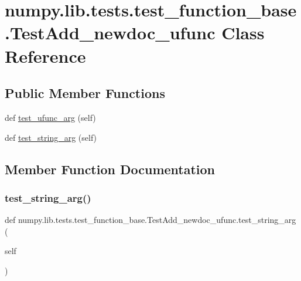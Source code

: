 \hypertarget{classnumpy_1_1lib_1_1tests_1_1test__function__base_1_1TestAdd__newdoc__ufunc}{}\section{numpy.\+lib.\+tests.\+test\+\_\+function\+\_\+base.\+Test\+Add\+\_\+newdoc\+\_\+ufunc Class Reference}
\label{classnumpy_1_1lib_1_1tests_1_1test__function__base_1_1TestAdd__newdoc__ufunc}
\subsection*{Public Member Functions}
\begin{DoxyCompactItemize}
\item 
def \hyperlink{classnumpy_1_1lib_1_1tests_1_1test__function__base_1_1TestAdd__newdoc__ufunc_a603346da4ac3570b4e5dba1690272c01}{test\+\_\+ufunc\+\_\+arg} (self)
\item 
def \hyperlink{classnumpy_1_1lib_1_1tests_1_1test__function__base_1_1TestAdd__newdoc__ufunc_a157568af842ece74d71ab498ad6e98dd}{test\+\_\+string\+\_\+arg} (self)
\end{DoxyCompactItemize}


\subsection{Member Function Documentation}
\mbox{\label{classnumpy_1_1lib_1_1tests_1_1test__function__base_1_1TestAdd__newdoc__ufunc_a157568af842ece74d71ab498ad6e98dd}} 
\subsubsection{\texorpdfstring{test\+\_\+string\+\_\+arg()}{test\_string\_arg()}}
{\footnotesize\ttfamily def numpy.\+lib.\+tests.\+test\+\_\+function\+\_\+base.\+Test\+Add\+\_\+newdoc\+\_\+ufunc.\+test\+\_\+string\+\_\+arg (\begin{DoxyParamCaption}\item[{}]{self }\end{DoxyParamCaption})}

